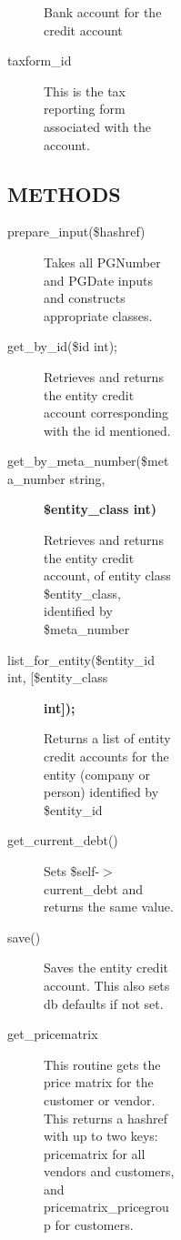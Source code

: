 \begin{description}
\begin{description}
\begin{description}
\begin{description}
\begin{description}
\begin{description}
\begin{description}
\begin{description}
\begin{description}
Bank account for the credit account


\item[{taxform\_id}] \mbox{}

This is the tax reporting form associated with the account.

\end{description}
\subsection*{METHODS\label{LedgerSMB::DBObject::Entity::Credit_Account_METHODS}}
\begin{description}

\item[{prepare\_input(\$hashref)}] \mbox{}

Takes all PGNumber and PGDate inputs and constructs appropriate classes.


\item[{get\_by\_id(\$id int);}] \mbox{}

Retrieves and returns the entity credit account corresponding with the id 
mentioned.


\item[{get\_by\_meta\_number(\$meta\_number string,}] \textbf{\$entity\_class int)}

Retrieves and returns the entity credit account, of entity class \$entity\_class, 
identified by \$meta\_number


\item[{list\_for\_entity(\$entity\_id int, [\$entity\_class}] \textbf{int]);}

Returns a list of entity credit accounts for the entity (company or person)
identified by \$entity\_id


\item[{get\_current\_debt()}] \mbox{}

Sets \$self-$>$current\_debt and returns the same value.


\item[{save()}] \mbox{}

Saves the entity credit account.  This also sets db defaults if not set.


\item[{get\_pricematrix}] \mbox{}

This routine gets the price matrix for the customer or vendor.  This returns a 
hashref with up to two keys:  pricematrix for all vendors and customers, and
pricematrix\_pricegroup for customers.



\end{description}
\end{description}
\end{description}
\end{description}
\end{description}
\end{description}
\end{description}
\end{description}
\end{description}
